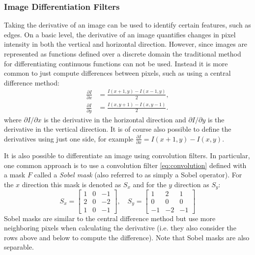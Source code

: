 \subsubsection{Image Differentiation Filters}
Taking the derivative of an image can be used to identify certain features, such as edges. On a basic level, the derivative of an image quantifies changes in pixel intensity in both the vertical and horizontal direction. However, since images are represented as functions defined over a discrete domain the traditional method for differentiating continuous functions can not be used. Instead it is more common to just compute differences between pixels, such as using a central difference method:
\begin{equation} \label{eq:cendiff}
\begin{split}
 \frac{\partial I} {\partial x} &= \frac{I(x+1,y) - I(x-1,y)}{2},\\
\frac{\partial I} {\partial y} &= \frac{I(x,y+1) - I(x,y-1)}{2}.  
\end{split}
\end{equation}
where $\partial I/\partial x$ is the derivative in the horizontal direction and $\partial I/\partial y$ is the derivative in the vertical direction. It is of course also possible to define the derivatives using just one side, for example $\frac{\partial I}{\partial x} = I(x+1,y) - I(x,y)$.

It is also possible to differentiate an image using convolution filters. In particular, one common approach is to use a convolution filter \eqref{eq:convolution} defined with a mask $F$ called a \textit{Sobel mask} (also referred to as simply a Sobel operator). For the $x$ direction this mask is denoted as $S_x$ and for the $y$ direction as $S_y$:
\begin{equation}
S_x = \begin{bmatrix}
1 & 0 & -1\\
2 & 0 & -2\\
1 & 0 & -1
\end{bmatrix}, \quad S_y =
\begin{bmatrix}
1 & 2 & 1\\
0 & 0 & 0\\
-1 & -2 & -1
\end{bmatrix}
\end{equation}
Sobel masks are similar to the central difference method but use more neighboring pixels when calculating the derivative (i.e. they also consider the rows above and below to compute the difference). Note that Sobel masks are also separable.

